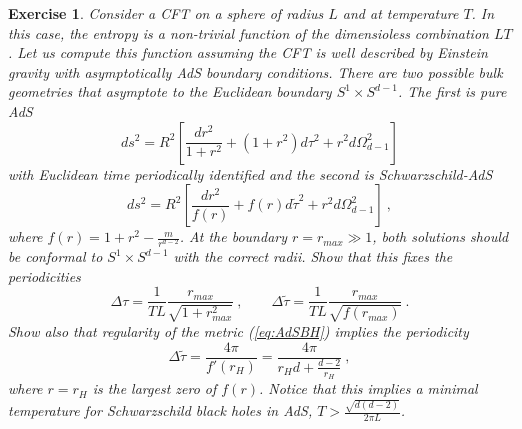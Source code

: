 \documentclass{ws-rv9x6}
\newtheorem{exercise}{Exercise}[section]
\newcommand\be{\begin{equation}}
\newcommand\ee{\end{equation}}
\begin{document}
\begin{exercise}  
\label{ex:HPtransition}
Consider a CFT on a sphere of radius $L$ and at
temperature $T$. In this case, the entropy is a non-trivial function
of the dimensioless combination $LT$. Let us compute this function
assuming the CFT is well described by Einstein gravity with asymptotically
AdS boundary conditions. There are two possible bulk geometries that
asymptote to the Euclidean boundary $S^{1}\times S^{d-1}$. The first
is pure AdS 
\begin{equation}
ds^{2}=R^{2}\left[\frac{dr^{2}}{1+r^{2}}+\left(1+r^{2}\right)d\tau^{2}+r^{2}d\Omega_{d-1}^{2}\right]\label{eq:pureAdSglobal}
\end{equation}
 with Euclidean time periodically identified and the second is Schwarzschild-AdS
\begin{equation}
ds^{2}=R^{2}\left[\frac{dr^{2}}{f(r)}+f(r)d\tilde{\tau}^{2}+r^{2}d\Omega_{d-1}^{2}\right]\ ,\label{eq:AdSBH}
\end{equation}
where $f(r)=1+r^{2}-\frac{m}{r^{d-2}}$. At the boundary $r=r_{max}\gg1$,
both solutions should be conformal to $S^{1}\times S^{d-1}$ with
the correct radii. Show that this fixes the periodicities 
\be
\Delta\tau=\frac{1}{TL}\frac{r_{max}}{\sqrt{1+r_{max}^{2}}}\ ,\qquad\Delta\tilde{\tau}=\frac{1}{TL}\frac{r_{max}}{\sqrt{f(r_{max})}}\ .
\ee
Show also that regularity of the metric (\ref{eq:AdSBH}) implies
the periodicity
\be
\Delta\tilde{\tau}=\frac{4\pi}{f'(r_{H})}=\frac{4\pi}{r_{H}d+\frac{d-2}{r_{H}}}\ ,
\ee
where $r=r_{H}$ is the largest zero of $f(r)$. Notice that this
implies a minimal temperature for Schwarzschild black holes in AdS,
$T>\frac{\sqrt{d(d-2)}}{2\pi L}$.


\end{exercise}
\end{document}
